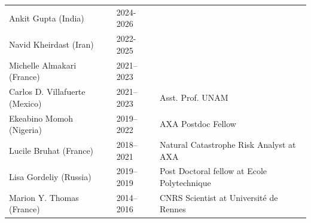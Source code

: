 \documentclass[10pt]{article}
\begin{document}
\begin{table}[h!]
 \renewcommand{\arraystretch}{0.5}

 
\begin{tabular}{L{6cm}L{2cm}D{7cm}}
\color{groy}Ankit Gupta (India)           & 2024-2026      &  \\
\color{groy}Navid Kheirdast (Iran)    	  & 2022-2025      &  \\
\color{black}Michelle Almakari (France)    & 2021–2023  &  \\
\color{black}Carlos D. Villafuerte (Mexico)   & 2021–2023  &  Asst. Prof. UNAM\\
\color{black}Ekeabino Momoh (Nigeria)   	  & 2019–2022  &  AXA Postdoc Fellow\\
\color{black}Lucile Bruhat (France)   	  & 2018–2021  &  Natural Catastrophe Risk Analyst at AXA\\
\color{black}Lisa Gordeliy (Russia)   	  & 2019–2019  &  Post Doctoral fellow at Ecole Polytechnique\\
\color{black}Marion Y. Thomas (France) 	  & 2014–2016  &  CNRS Scientist at Université de Rennes\\[16pt]
\end{tabular}



\end{table}
\end{document}
